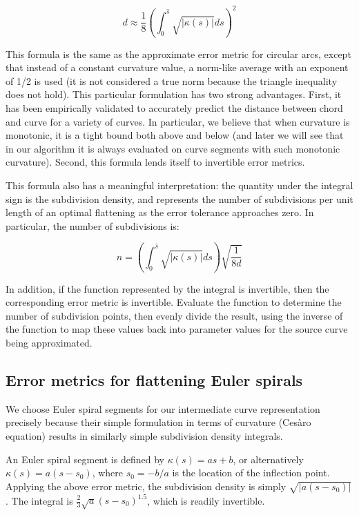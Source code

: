 \documentclass[sigconf, nonacm]{acmart}
\begin{document}
\[
    d \approx \frac{1}{8}\left(\int_0^{\hat{s}} \sqrt{|\kappa(s)|}ds \right)^2
\]


This formula is the same as the approximate error metric for circular arcs, except that instead of a constant curvature value, a norm-like average with an exponent of 1/2 is used (it is not considered a true norm because the triangle inequality does not hold). This particular formulation has two strong advantages. First, it has been empirically validated to accurately predict the distance between chord and curve for a variety of curves. In particular, we believe that when curvature is monotonic, it is a tight bound both above and below (and later we will see that in our algorithm it is always evaluated on curve segments with such monotonic curvature). Second, this formula lends itself to invertible error metrics.

This formula also has a meaningful interpretation: the quantity under the integral sign is the subdivision density, and represents the number of subdivisions per unit length of an optimal flattening as the error tolerance approaches zero. In particular, the number of subdivisions is:

\[
    n = \left(\int_0^{\hat{s}} \sqrt{|\kappa(s)|}ds \right)\sqrt{\frac{1}{8d}}
\]

In addition, if the function represented by the integral is invertible, then the corresponding error metric is invertible. Evaluate the function to determine the number of subdivision points, then evenly divide the result, using the inverse of the function to map these values back into parameter values for the source curve being approximated.

\subsection{Error metrics for flattening Euler spirals}

We choose Euler spiral segments for our intermediate curve representation precisely because their simple formulation in terms of curvature (Cesàro equation) results in similarly simple subdivision density integrals.

An Euler spiral segment is defined by $\kappa(s) = as+b$, or alternatively $\kappa(s) = a(s-s_0)$, where $s_0 = -b/a$ is the location of the inflection point. Applying the above error metric, the subdivision density is simply $\sqrt{|a(s-s_0)|}$. The integral is $\frac{2}{3}\sqrt{a}(s-s_0)^{1.5}$, which is readily invertible.
\end{document}
